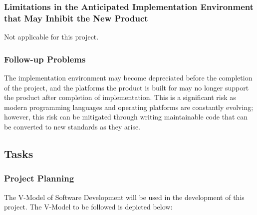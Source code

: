 \documentclass[12pt, titlepage]{article}
\begin{document}
\subsubsection{Limitations in the Anticipated Implementation Environment that 
May Inhibit the New Product}
Not applicable for this project.

\subsubsection{Follow-up Problems}
The implementation environment may become depreciated before the completion of 
the project, and the platforms the product is built for may no longer support 
the product after completion of implementation. This is a significant risk as 
modern programming languages and operating platforms are constantly evolving; 
however, this risk can be mitigated through writing maintainable code that can 
be converted to new standards as they arise.

\subsection{Tasks}
\subsubsection{Project Planning}
The V-Model of Software Development will be used in the development of this 
project. The V-Model to be followed is depicted below:
\end{document}
